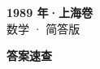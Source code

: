 \documentclass[zihao=-4, a4paper]{ctexart}
\begin{document}
\begin{center}
  {\Large\bfseries 1989 年·上海卷}\\[4pt]
  {\large 数学 · 简答版}
\end{center}
\medskip
{}

\clearpage
{}
\begin{center}{\Large\bfseries 答案速查}\end{center}
\medskip

\end{document}
